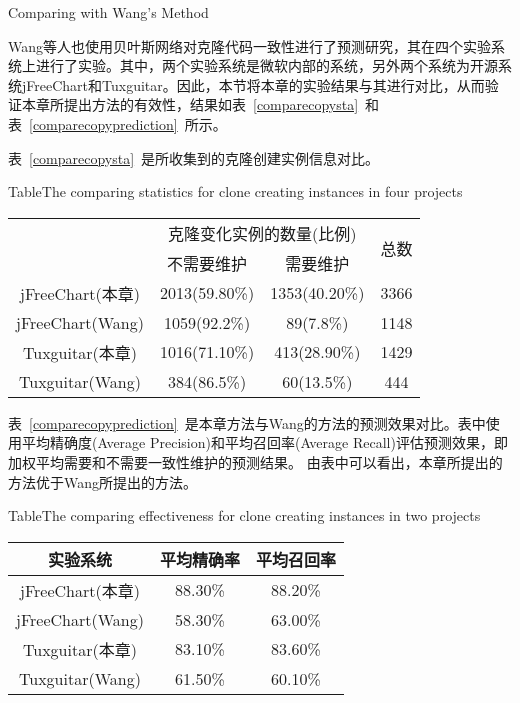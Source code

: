 {Comparing with Wang’s Method}

Wang\cite{wang2014predicting}等人也使用贝叶斯网络对克隆代码一致性进行了预测研究，其在四个实验系统上进行了实验。其中，两个实验系统是微软内部的系统，另外两个系统为开源系统jFreeChart和Tuxguitar。因此，本节将本章的实验结果与其进行对比，从而验证本章所提出方法的有效性，结果如表~\ref{comparecopysta}~和表~\ref{comparecopyprediction}~所示。

表~\ref{comparecopysta}~是所收集到的克隆创建实例信息对比。

\begin{table}[htbp]
{Table$\!$}{The comparing statistics for clone creating instances in four projects}
\vspace{0.5em}
\centering
\wuhao
\begin{tabular}{cccc}
\toprule[1.5pt]
~\multirow{2}{*}{实验系统}& \multicolumn{2}{c}{克隆变化实例的数量(比例)} & \multirow{2}{*}{总数}\\ 
 \cline{2-3}
~&{不需要维护} &{需要维护} & ~\\
\midrule[1pt]
jFreeChart(本章)&	2013(59.80\%)&	1353(40.20\%)&	3366\\
jFreeChart(Wang)&1059(92.2\%)&	89(7.8\%)&	1148\\
Tuxguitar(本章)&	1016(71.10\%)&	413(28.90\%)&	1429\\
Tuxguitar(Wang)&384(86.5\%)&	60(13.5\%)&	444\\
\bottomrule[1.5pt]
\end{tabular}
\end{table}

表~\ref{comparecopyprediction}~是本章方法与Wang的方法的预测效果对比。表中使用平均精确度(Average Precision)和平均召回率(Average Recall)评估预测效果，即加权平均需要和不需要一致性维护的预测结果。
由表中可以看出，本章所提出的方法优于Wang所提出的方法。

\begin{table}[htbp]
{Table$\!$}{The comparing effectiveness for clone creating instances in two projects}
\vspace{0.5em}
\centering
\wuhao
\begin{tabular}{ccc}
\toprule[1.5pt]
{实验系统}&{平均精确率} &{平均召回率}\\ 
\midrule[1pt]
jFreeChart(本章)&	88.30\%& 88.20\%\\
jFreeChart(Wang)&58.30\%&	63.00\%\\
Tuxguitar(本章)&	83.10\%&	83.60\%\\
Tuxguitar(Wang)&61.50\%&	60.10\%\\
\bottomrule[1.5pt]
\end{tabular}
\end{table}

